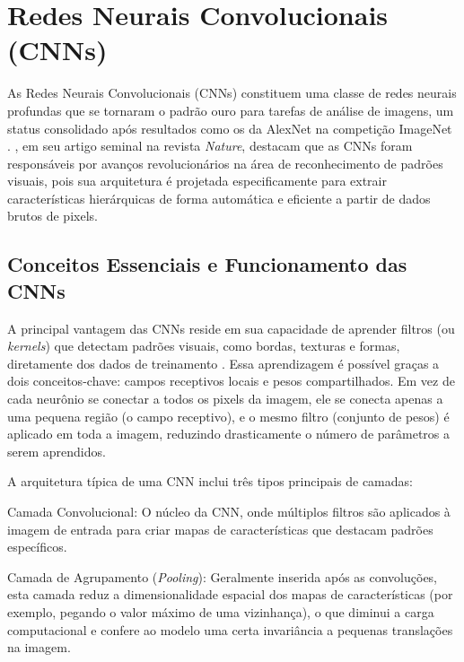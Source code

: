 \section{Redes Neurais Convolucionais (CNNs)}

As Redes Neurais Convolucionais (CNNs) constituem uma classe de redes neurais profundas que se
tornaram o padrão ouro para tarefas de análise de imagens, um status consolidado após
resultados como os da AlexNet na competição ImageNet \cite{krizhevsky2012imagenet}.
, em seu artigo seminal na revista \textit{Nature}, destacam que as
CNNs foram responsáveis por avanços revolucionários na área de reconhecimento de padrões
visuais, pois sua arquitetura é projetada especificamente para extrair características
hierárquicas de forma automática e eficiente a partir de dados brutos de pixels.

\subsection{Conceitos Essenciais e Funcionamento das CNNs}

A principal vantagem das CNNs reside em sua capacidade de aprender filtros (ou
\textit{kernels}) que detectam padrões visuais, como bordas, texturas e formas, diretamente
dos dados de treinamento \cite{lecun2015deep}. Essa aprendizagem é possível graças a dois
conceitos-chave: campos receptivos locais e pesos compartilhados. Em vez de cada neurônio se
conectar a todos os pixels da imagem, ele se conecta apenas a uma pequena região (o campo
receptivo), e o mesmo filtro (conjunto de pesos) é aplicado em toda a imagem, reduzindo
drasticamente o número de parâmetros a serem aprendidos.

A arquitetura típica de uma CNN inclui três tipos principais de camadas:

Camada Convolucional: O núcleo da CNN, onde múltiplos filtros são aplicados à imagem de
entrada para criar mapas de características que destacam padrões específicos.

Camada de Agrupamento (\textit{Pooling}): Geralmente inserida após as convoluções, esta camada
reduz a dimensionalidade espacial dos mapas de características (por exemplo, pegando o valor
máximo de uma vizinhança), o que diminui a carga computacional e confere ao modelo uma certa
invariância a pequenas translações na imagem.

